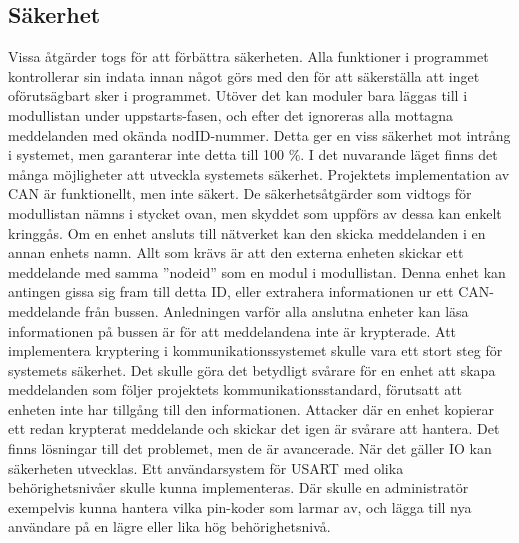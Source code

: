 \subsection{Säkerhet}
\label{sec:sakerhet}
Vissa åtgärder togs för att förbättra säkerheten. Alla funktioner i programmet kontrollerar sin indata innan något görs med den för att säkerställa att inget oförutsägbart sker i programmet. Utöver det kan moduler bara läggas till i modullistan under uppstarts-fasen, och efter det ignoreras alla mottagna meddelanden med okända nodID-nummer. Detta ger en viss säkerhet mot intrång i systemet, men garanterar inte detta till 100 \%. \newline \newline
I det nuvarande läget finns det många möjligheter att utveckla systemets säkerhet. Projektets implementation av CAN är funktionellt, men inte säkert. De säkerhetsåtgärder som vidtogs för modullistan nämns i stycket ovan, men skyddet som uppförs av dessa kan enkelt kringgås. Om en enhet ansluts till nätverket kan den skicka meddelanden i en annan enhets namn. Allt som krävs är att den externa enheten skickar ett meddelande med samma ''nodeid'' som en modul i modullistan. Denna enhet kan antingen gissa sig fram till detta ID, eller extrahera informationen ur ett CAN-meddelande från bussen. \newline \newline
Anledningen varför alla anslutna enheter kan läsa informationen på bussen är för att meddelandena inte är krypterade. Att implementera kryptering i kommunikationssystemet skulle vara ett stort steg för systemets säkerhet. Det skulle göra det betydligt svårare för en enhet att skapa meddelanden som följer projektets kommunikationsstandard, förutsatt att enheten inte har tillgång till den informationen. Attacker där en enhet kopierar ett redan krypterat meddelande och skickar det igen är svårare att hantera. Det finns lösningar till det problemet, men de är avancerade.
\newline \newline
När det gäller IO kan säkerheten utvecklas. Ett användarsystem för USART med olika behörighetsnivåer skulle kunna implementeras. Där skulle en administratör exempelvis kunna hantera vilka pin-koder som larmar av, och lägga till nya användare på en lägre eller lika hög behörighetsnivå.
